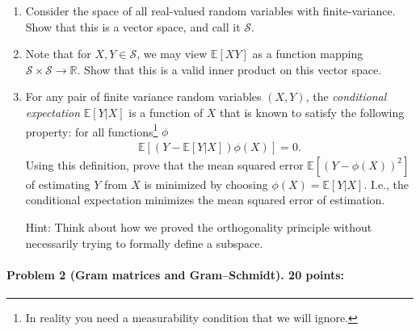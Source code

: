 \documentclass[11pt,twoside]{article}
\begin{document}
\begin{enumerate}[label=(\alph*)]
\item Consider the space of all real-valued random variables with finite-variance. Show that this is a vector space, and call it $\mathcal{S}$.

\item Note that for $X, Y \in \mathcal{S}$, we may view $\mathbb{E}[XY]$ as a function mapping $\mathcal{S} \times \mathcal{S} \to \mathbb{R}$. Show that this is a valid inner product on this vector space.

\item For any pair of finite variance random variables $(X, Y)$, the \emph{conditional expectation} $\mathbb{E}[Y | X]$ is a function of $X$ that is known to satisfy the following property: for all functions\footnote{In reality you need a measurability condition that we will ignore.} $\phi$
\begin{align*}
\mathbb{E} [ (Y - \mathbb{E}[Y | X]) \phi(X) ] = 0.
\end{align*}
Using this definition, prove that the mean squared error $\mathbb{E}[ (Y - \phi(X))^2]$ of estimating $Y$ from $X$ is minimized by choosing $\phi(X) = \mathbb{E}[Y | X]$. I.e., the conditional expectation minimizes the mean squared error of estimation.

\noindent Hint: Think about how we proved the orthogonality principle without necessarily trying to formally define a subspace.
\end{enumerate}




\paragraph{Problem 2 (Gram matrices and Gram--Schmidt). 20 points:}
\end{document}
